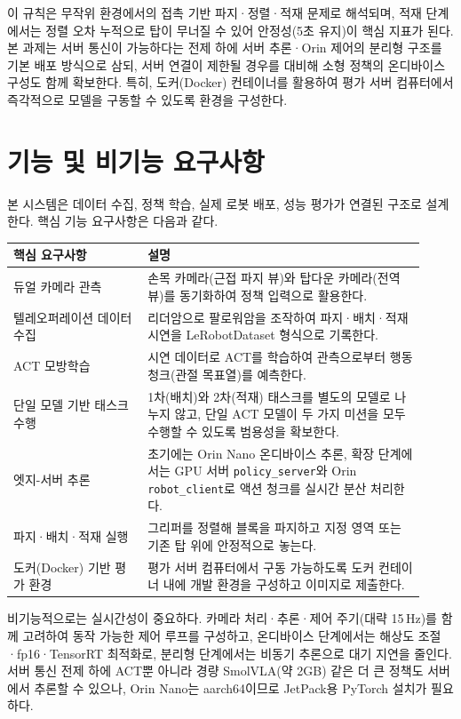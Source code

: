 \documentclass[titlepage]{pnureport}
\begin{document}
이 규칙은 무작위 환경에서의 접촉 기반 파지·정렬·적재 문제로 해석되며, 적재 단계에서는 정렬 오차 누적으로 탑이 무너질 수 있어 안정성(5초 유지)이 핵심 지표가 된다. 본 과제는 서버 통신이 가능하다는 전제 하에 서버 추론·Orin 제어의 분리형 구조를 기본 배포 방식으로 삼되, 서버 연결이 제한될 경우를 대비해 소형 정책의 온디바이스 구성도 함께 확보한다. 특히, 도커(Docker) 컨테이너를 활용하여 평가 서버 컴퓨터에서 즉각적으로 모델을 구동할 수 있도록 환경을 구성한다.

\section{기능 및 비기능 요구사항}

본 시스템은 데이터 수집, 정책 학습, 실제 로봇 배포, 성능 평가가 연결된 구조로 설계한다. 핵심 기능 요구사항은 다음과 같다.

\begin{longtable}{p{0.30\linewidth}p{0.62\linewidth}}
\toprule
핵심 요구사항 & 설명 \\
\midrule
\endhead
듀얼 카메라 관측 & 손목 카메라(근접 파지 뷰)와 탑다운 카메라(전역 뷰)를 동기화하여 정책 입력으로 활용한다. \\
텔레오퍼레이션 데이터 수집 & 리더암으로 팔로워암을 조작하여 파지·배치·적재 시연을 LeRobotDataset 형식으로 기록한다. \\
ACT 모방학습 & 시연 데이터로 ACT를 학습하여 관측으로부터 행동 청크(관절 목표열)를 예측한다. \\
단일 모델 기반 태스크 수행 & 1차(배치)와 2차(적재) 태스크를 별도의 모델로 나누지 않고, 단일 ACT 모델이 두 가지 미션을 모두 수행할 수 있도록 범용성을 확보한다. \\
엣지-서버 추론 & 초기에는 Orin Nano 온디바이스 추론, 확장 단계에서는 GPU 서버 \texttt{policy\_server}와 Orin \texttt{robot\_client}로 액션 청크를 실시간 분산 처리한다. \\
파지·배치·적재 실행 & 그리퍼를 정렬해 블록을 파지하고 지정 영역 또는 기존 탑 위에 안정적으로 놓는다. \\
도커(Docker) 기반 평가 환경 & 평가 서버 컴퓨터에서 구동 가능하도록 도커 컨테이너 내에 개발 환경을 구성하고 이미지로 제출한다. \\
\bottomrule
\end{longtable}

비기능적으로는 실시간성이 중요하다. 카메라 처리·추론·제어 주기(대략 15\,Hz)를 함께 고려하여 동작 가능한 제어 루프를 구성하고, 온디바이스 단계에서는 해상도 조절·fp16·TensorRT 최적화\cite{nvidia-tensorrt}로, 분리형 단계에서는 비동기 추론으로 대기 지연을 줄인다. 서버 통신 전제 하에 ACT뿐 아니라 경량 SmolVLA(약 2GB)\cite{smolvla} 같은 더 큰 정책도 서버에서 추론할 수 있으나, Orin Nano는 aarch64이므로 JetPack용 PyTorch 설치가 필요하다. 
\end{document}
